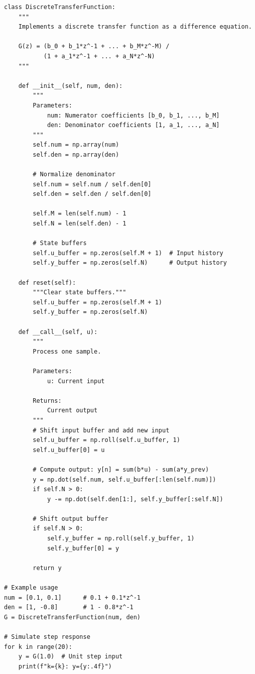 \begin{verbatim}
class DiscreteTransferFunction:
    """
    Implements a discrete transfer function as a difference equation.

    G(z) = (b_0 + b_1*z^-1 + ... + b_M*z^-M) /
           (1 + a_1*z^-1 + ... + a_N*z^-N)
    """

    def __init__(self, num, den):
        """
        Parameters:
            num: Numerator coefficients [b_0, b_1, ..., b_M]
            den: Denominator coefficients [1, a_1, ..., a_N]
        """
        self.num = np.array(num)
        self.den = np.array(den)

        # Normalize denominator
        self.num = self.num / self.den[0]
        self.den = self.den / self.den[0]

        self.M = len(self.num) - 1
        self.N = len(self.den) - 1

        # State buffers
        self.u_buffer = np.zeros(self.M + 1)  # Input history
        self.y_buffer = np.zeros(self.N)      # Output history

    def reset(self):
        """Clear state buffers."""
        self.u_buffer = np.zeros(self.M + 1)
        self.y_buffer = np.zeros(self.N)

    def __call__(self, u):
        """
        Process one sample.

        Parameters:
            u: Current input

        Returns:
            Current output
        """
        # Shift input buffer and add new input
        self.u_buffer = np.roll(self.u_buffer, 1)
        self.u_buffer[0] = u

        # Compute output: y[n] = sum(b*u) - sum(a*y_prev)
        y = np.dot(self.num, self.u_buffer[:len(self.num)])
        if self.N > 0:
            y -= np.dot(self.den[1:], self.y_buffer[:self.N])

        # Shift output buffer
        if self.N > 0:
            self.y_buffer = np.roll(self.y_buffer, 1)
            self.y_buffer[0] = y

        return y

# Example usage
num = [0.1, 0.1]      # 0.1 + 0.1*z^-1
den = [1, -0.8]       # 1 - 0.8*z^-1
G = DiscreteTransferFunction(num, den)

# Simulate step response
for k in range(20):
    y = G(1.0)  # Unit step input
    print(f"k={k}: y={y:.4f}")
\end{verbatim}

